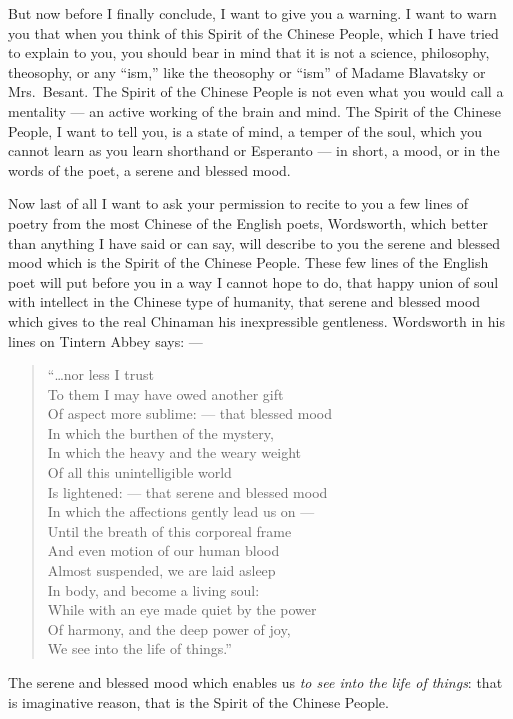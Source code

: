 \vspace{0.2cm}
But now before I finally conclude, I want to give you a warning.
I want to warn you that when you think of this Spirit of the Chinese People, which I have tried to explain to you, you should bear in mind that it is not a science, philosophy, theosophy, or any ``ism,'' like the theosophy or ``ism'' of Madame Blavatsky  or Mrs.~Besant. 
The Spirit of the Chinese People is not even what you would call a mentality --- an active working of the brain and mind.
The Spirit of the Chinese People, I want to tell you, is a state of mind, a temper of the soul, which you cannot learn as you learn shorthand or Esperanto --- in short, a mood, or in the words of the poet, a serene and blessed mood.

Now last of all I want to ask your permission to recite to you a few lines of poetry from the most Chinese of the English poets, Wordsworth,  which better than anything I have said or can say, will describe to you the serene and blessed mood which is the Spirit of the Chinese People.
These few lines of the English poet will put before you in a way I cannot hope to do, that happy union of soul with intellect in the Chinese type of humanity, that serene and blessed mood which gives to the real Chinaman his inexpressible gentleness.
Wordsworth in his lines on Tintern Abbey  says: ---
\begin{quote}\footnotesize
   ``\dots nor less I trust \\
   To them I may have owed another gift \\
   Of aspect more sublime: --- that blessed mood \\
   In which the burthen of the mystery, \\
   In which the heavy and the weary weight \\
   Of all this unintelligible world \\
   Is lightened: --- that serene and blessed mood \\
   In which the affections gently lead us on --- \\
   Until the breath of this corporeal frame \\
   And even motion of our human blood \\
   Almost suspended, we are laid asleep \\
   In body, and become a living soul: \\
   While with an eye made quiet by the power \\
   Of harmony, and the deep power of joy, \\
   We see into the life of things.''   
\end{quote}


The serene and blessed mood which enables us \emph{to see into the life of things}: that is imaginative reason, that is the Spirit of the Chinese People.
